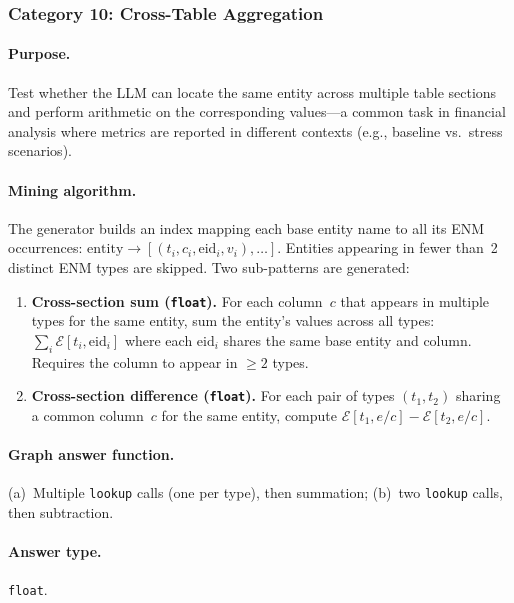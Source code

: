 \documentclass[11pt]{article}
\begin{document}
\subsubsection{Category 10: Cross-Table Aggregation}

\paragraph{Purpose.}  Test whether the LLM can locate the same entity
across multiple table sections and perform arithmetic on the
corresponding values---a common task in financial analysis where metrics
are reported in different contexts (e.g., baseline vs.\ stress scenarios).

\paragraph{Mining algorithm.}
The generator builds an index mapping each base entity name to all its
ENM occurrences: $\text{entity} \to [(t_i, c_i, \text{eid}_i, v_i),
\ldots]$.  Entities appearing in fewer than~2 distinct ENM types are
skipped.  Two sub-patterns are generated:

\begin{enumerate}[leftmargin=2em, label=(\alph*)]
  \item \textbf{Cross-section sum (\texttt{float}).}
    For each column~$c$ that appears in multiple types for the same
    entity, sum the entity's values across all types:
    $\sum_i \mathcal{E}[t_i, \text{eid}_i]$ where each $\text{eid}_i$
    shares the same base entity and column.  Requires the column to
    appear in $\geq 2$ types.

  \item \textbf{Cross-section difference (\texttt{float}).}
    For each pair of types $(t_1, t_2)$ sharing a common column~$c$ for
    the same entity, compute
    $\mathcal{E}[t_1, e/c] - \mathcal{E}[t_2, e/c]$.
\end{enumerate}

\paragraph{Graph answer function.}
(a)~Multiple \texttt{lookup} calls (one per type), then summation;
(b)~two \texttt{lookup} calls, then subtraction.

\paragraph{Answer type.} \texttt{float}.
\end{document}
